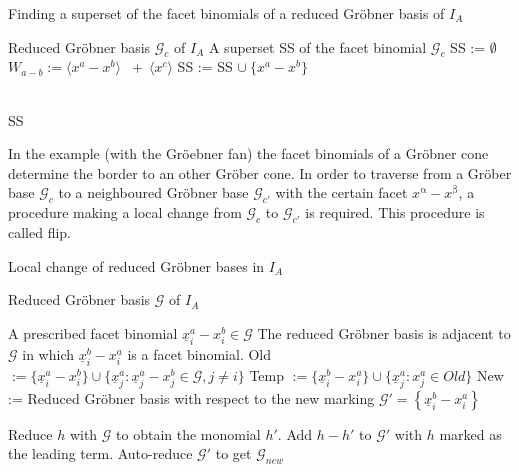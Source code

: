 \begin{algorithm}
\caption{Finding a superset of the facet binomials
of a reduced Gröbner basis of $I_A$ \cite{tigers}}
\label{alg:facetSS}
\begin{algorithmic}[1]

\Input
Reduced Gröbner basis $ \mathcal{G}_{c} $ of $I_A$
\Output A superset SS of the facet binomial $\mathcal{G}_{c}$
\State SS := $\emptyset$
\State $W_{a - b} := \langle x^{a}-x^{b}\rangle$
$~+~ \langle x^{c} \rangle$ 
\State SS := SS $\cup~ \{x^{a}-x^{b} \}$

\EndIf
\EndFor \\
\Return SS

\end{algorithmic}
\end{algorithm}
 

In the example (with the Gröebner fan) the facet binomials of a Gröbner cone determine the border to an other Gröber cone.
In order to traverse from a Gröber base $\mathcal{G}_c$ to a neighboured Gröbner base $\mathcal{G}_{c'}$ with the certain facet $x^{\upalpha}-x^{\upbeta} $, a procedure making a local change from $\mathcal{G}_c$ to $\mathcal{G}_{c'}$ is required.
This procedure is called flip. 
\newpage


\begin{algorithm}
\caption{Local change of reduced Gröbner bases in $I_A$ \cite{tigers}}
\label{alg:flip}
\begin{algorithmic}[1]

\Input
Reduced Gröbner basis $ \mathcal{G} $ of $I_A$

    A prescribed facet binomial $ \underline{x}^{a}_{i} - x^{b}_{i} \in \mathcal{G} $
\Output The reduced Gröbner basis is adjacent to $\mathcal{G}$ in which $ \underline{x}^{b}_{i} - x^{a}_{i} $ is a facet binomial.
\State Old 
$:= \lbrace \underline{x}^{a}_{i} - x^{b}_{i} \rbrace \cup
 \lbrace \underline{x}^{a}_{j} : \underline{x}^{a}_{j} - x^{b}_{j} \in \mathcal{G},
 j \neq i \rbrace $ 
 \State Temp $:= \lbrace \underline{x}^{b}_{i} - x^{a}_{i} \rbrace \cup 
 \lbrace \underline{x}^{a}_{j} : x^{a}_{j} \in Old  \rbrace $
 \State New := Reduced Gröbner basis with respect to the new marking 
 \State $\mathcal{G}' = \left\lbrace \underline{x}^{b}_{i} - x^{a}_{i} \right\rbrace  $
 
 \State Reduce $h$ with $\mathcal{G}$ to obtain the monomial $h'$.
 \State Add $h-h'$ to $\mathcal{G}'$ with $h$ marked as the leading term.
 \EndFor
 \State Auto-reduce $\mathcal{G}'$ to get $\mathcal{G}_{new}$

\end{algorithmic}
\end{algorithm}

